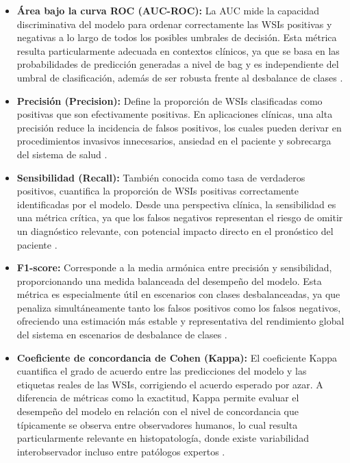 \begin{itemize}

    \item \textbf{Área bajo la curva ROC (AUC-ROC):}  
    La AUC mide la capacidad discriminativa del modelo para ordenar correctamente las WSIs positivas y negativas a lo largo de todos los posibles umbrales de decisión. Esta métrica resulta particularmente adecuada en contextos clínicos, ya que se basa en las probabilidades de predicción generadas a nivel de bag y es independiente del umbral de clasificación, además de ser robusta frente al desbalance de clases \cite{Géron_2022}.

    \item \textbf{Precisión (Precision):}  
    Define la proporción de WSIs clasificadas como positivas que son efectivamente positivas. En aplicaciones clínicas, una alta precisión reduce la incidencia de falsos positivos, los cuales pueden derivar en procedimientos invasivos innecesarios, ansiedad en el paciente y sobrecarga del sistema de salud \cite{Géron_2022}.

    \item \textbf{Sensibilidad (Recall):}  
    También conocida como tasa de verdaderos positivos, cuantifica la proporción de WSIs positivas correctamente identificadas por el modelo. Desde una perspectiva clínica, la sensibilidad es una métrica crítica, ya que los falsos negativos representan el riesgo de omitir un diagnóstico relevante, con potencial impacto directo en el pronóstico del paciente \cite{Géron_2022}.

    \item \textbf{F1-score:}  
    Corresponde a la media armónica entre precisión y sensibilidad, proporcionando una medida balanceada del desempeño del modelo. Esta métrica es especialmente útil en escenarios con clases desbalanceadas, ya que penaliza simultáneamente tanto los falsos positivos como los falsos negativos, ofreciendo una estimación más estable y representativa del rendimiento global del sistema en escenarios de desbalance de clases \cite{Géron_2022}.

    \item \textbf{Coeficiente de concordancia de Cohen (Kappa):}  
    El coeficiente Kappa cuantifica el grado de acuerdo entre las predicciones del modelo y las etiquetas reales de las WSIs, corrigiendo el acuerdo esperado por azar. A diferencia de métricas como la exactitud, Kappa permite evaluar el desempeño del modelo en relación con el nivel de concordancia que típicamente se observa entre observadores humanos, lo cual resulta particularmente relevante en histopatología, donde existe variabilidad interobservador incluso entre patólogos expertos \cite{mchugh2012interrater}.

\end{itemize}

